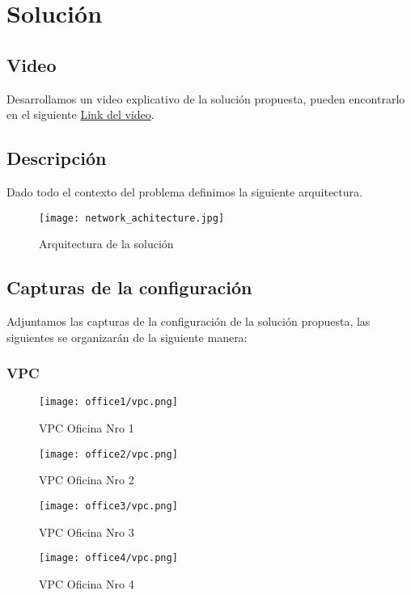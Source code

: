 \section{Solución}

\subsection{Video}
Desarrollamos un video explicativo de la solución propuesta, pueden encontrarlo
en el siguiente \href{https://drive.google.com/file/d/1IIQQ8OpVXsB-cUmFpYa2JtmtrdjKh3AB/view?usp=sharing}{Link del video}.

\subsection{Descripción}
Dado todo el contexto del problema definimos la siguiente arquitectura.

\begin{figure}[h]
    \centering
    \texttt{[image: network\_achitecture.jpg]}
    \caption{Arquitectura de la solución}
\end{figure}

\subsection{Capturas de la configuración}
Adjuntamos las capturas de la configuración de la solución propuesta,
las siguientes se organizarán de la siguiente manera:

\subsubsection{VPC}
\begin{figure}[h!]
    \centering
    \texttt{[image: office1/vpc.png]}
    \caption{VPC Oficina Nro 1}
\end{figure}
\begin{figure}[h!]
    \centering
    \texttt{[image: office2/vpc.png]}
    \caption{VPC Oficina Nro 2}
\end{figure}
\begin{figure}[h!]
    \centering
    \texttt{[image: office3/vpc.png]}
    \caption{VPC Oficina Nro 3}
\end{figure}
\begin{figure}[h!]
    \centering
    \texttt{[image: office4/vpc.png]}
    \caption{VPC Oficina Nro 4}
\end{figure}


